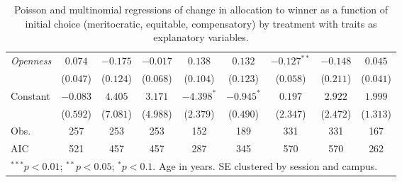 \begin{table}[htpb]
\begin{tabular}{l cccc | cccc}
\textit{Openness} & $0.074$ & $-0.175$ & $-0.017$ & $0.138$ & $0.132$ & $-0.127^{**}$ & $-0.148$ & $0.045$ \\
           & ($0.047$) & ($0.124$) & ($0.068$) & ($0.104$) & ($0.123$) & ($0.058$) & ($0.211$) & ($0.041$) \\
Constant & $-0.083$ & $4.405$ & $3.171$ & $-4.398^{*}$ & $-0.945^{*}$ & $0.197$ & $2.922$ & $1.999$ \\
           & ($0.592$) & ($7.081$) & ($4.988$) & ($2.379$) & ($0.490$) & ($2.347$) & ($2.472$) & ($1.313$) \\
\midrule
Obs. & 257 & 253 & 253 & 152 & 189 & 331 & 331 & 167 \\
AIC  & 521 & 457 & 457 & 287 & 345 & 570 & 570 & 262 \\
\bottomrule
\multicolumn{9}{l}{\footnotesize $^{***}p<0.01$; $^{**}p<0.05$; $^{*}p<0.1$. Age in years. SE clustered by session and campus.}
\end{tabular}
\caption{Poisson and multinomial regressions of change in allocation to winner as a function of initial choice (meritocratic, equitable, compensatory) by treatment with traits as explanatory variables.}
\label{table-revisions-traits}
\end{table}
